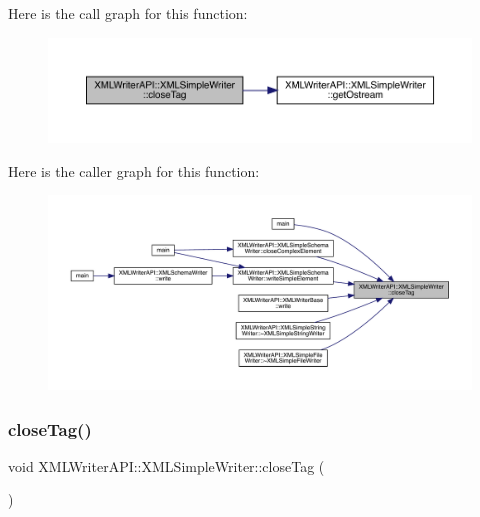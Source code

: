 Here is the call graph for this function\+:\nopagebreak
\begin{figure}[H]
\begin{center}
\leavevmode
\includegraphics[width=350pt]{d5/de1/classXMLWriterAPI_1_1XMLSimpleWriter_a824d840afc871a81114406844810e958_cgraph}
\end{center}
\end{figure}
Here is the caller graph for this function\+:\nopagebreak
\begin{figure}[H]
\begin{center}
\leavevmode
\includegraphics[width=350pt]{d5/de1/classXMLWriterAPI_1_1XMLSimpleWriter_a824d840afc871a81114406844810e958_icgraph}
\end{center}
\end{figure}
\mbox{\label{classXMLWriterAPI_1_1XMLSimpleWriter_a29af28d2a197f00ad568f39304ecdbe5}} 
\subsubsection{\texorpdfstring{closeTag()}{closeTag()}\hspace{0.1cm}{\footnotesize\ttfamily [2/2]}}
{\footnotesize\ttfamily void X\+M\+L\+Writer\+A\+P\+I\+::\+X\+M\+L\+Simple\+Writer\+::close\+Tag (\begin{DoxyParamCaption}{ }\end{DoxyParamCaption})}

